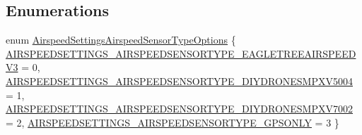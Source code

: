 \subsection*{\-Enumerations}
\begin{DoxyCompactItemize}
\item 
enum \hyperlink{group___airspeed_settings_ga7e4f280ca6af021e2cde7b1e7fb7e10b}{\-Airspeed\-Settings\-Airspeed\-Sensor\-Type\-Options} \{ \hyperlink{group___airspeed_settings_gga7e4f280ca6af021e2cde7b1e7fb7e10ba3a997774356103cb892e0a88f33166d5}{\-A\-I\-R\-S\-P\-E\-E\-D\-S\-E\-T\-T\-I\-N\-G\-S\-\_\-\-A\-I\-R\-S\-P\-E\-E\-D\-S\-E\-N\-S\-O\-R\-T\-Y\-P\-E\-\_\-\-E\-A\-G\-L\-E\-T\-R\-E\-E\-A\-I\-R\-S\-P\-E\-E\-D\-V3} = 0, 
\hyperlink{group___airspeed_settings_gga7e4f280ca6af021e2cde7b1e7fb7e10ba35f7698842d282b0ed22bc8be9e057a6}{\-A\-I\-R\-S\-P\-E\-E\-D\-S\-E\-T\-T\-I\-N\-G\-S\-\_\-\-A\-I\-R\-S\-P\-E\-E\-D\-S\-E\-N\-S\-O\-R\-T\-Y\-P\-E\-\_\-\-D\-I\-Y\-D\-R\-O\-N\-E\-S\-M\-P\-X\-V5004} = 1, 
\hyperlink{group___airspeed_settings_gga7e4f280ca6af021e2cde7b1e7fb7e10badcf09c07b74b56cb908cb591ebfc520e}{\-A\-I\-R\-S\-P\-E\-E\-D\-S\-E\-T\-T\-I\-N\-G\-S\-\_\-\-A\-I\-R\-S\-P\-E\-E\-D\-S\-E\-N\-S\-O\-R\-T\-Y\-P\-E\-\_\-\-D\-I\-Y\-D\-R\-O\-N\-E\-S\-M\-P\-X\-V7002} = 2, 
\hyperlink{group___airspeed_settings_gga7e4f280ca6af021e2cde7b1e7fb7e10baf2e803f027ae0fc669050e45e334f5f4}{\-A\-I\-R\-S\-P\-E\-E\-D\-S\-E\-T\-T\-I\-N\-G\-S\-\_\-\-A\-I\-R\-S\-P\-E\-E\-D\-S\-E\-N\-S\-O\-R\-T\-Y\-P\-E\-\_\-\-G\-P\-S\-O\-N\-L\-Y} = 3
 \}
\end{DoxyCompactItemize}
